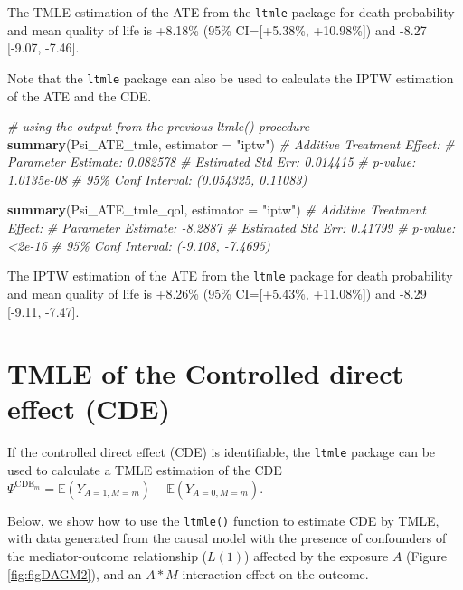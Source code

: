 \documentclass[
]{book}
\newenvironment{Shaded}{\begin{snugshade}}{\end{snugshade}}
\newcommand{\AttributeTok}[1]{\textcolor[rgb]{0.13,0.29,0.53}{#1}}
\newcommand{\CommentTok}[1]{\textcolor[rgb]{0.56,0.35,0.01}{\textit{#1}}}
\newcommand{\FunctionTok}[1]{\textcolor[rgb]{0.13,0.29,0.53}{\textbf{#1}}}
\newcommand{\NormalTok}[1]{#1}
\newcommand{\StringTok}[1]{\textcolor[rgb]{0.31,0.60,0.02}{#1}}
\begin{document}
The TMLE estimation of the ATE from the \texttt{ltmle} package for death probability and mean quality of life is +8.18\% (95\% CI={[}+5.38\%, +10.98\%{]}) and -8.27 {[}-9.07, -7.46{]}.

Note that the \texttt{ltmle} package can also be used to calculate the IPTW estimation of the ATE and the CDE.

\begin{Shaded}
\begin{Highlighting}[]
\CommentTok{\# using the output from the previous ltmle() procedure}
\FunctionTok{summary}\NormalTok{(Psi\_ATE\_tmle, }\AttributeTok{estimator =} \StringTok{"iptw"}\NormalTok{)}
\CommentTok{\# Additive Treatment Effect:}
\CommentTok{\#    Parameter Estimate:  0.082578 }
\CommentTok{\#     Estimated Std Err:  0.014415 }
\CommentTok{\#               p{-}value:  1.0135e{-}08 }
\CommentTok{\#     95\% Conf Interval: (0.054325, 0.11083) }

\FunctionTok{summary}\NormalTok{(Psi\_ATE\_tmle\_qol, }\AttributeTok{estimator =} \StringTok{"iptw"}\NormalTok{)}
\CommentTok{\# Additive Treatment Effect:}
\CommentTok{\#    Parameter Estimate:  {-}8.2887 }
\CommentTok{\#     Estimated Std Err:  0.41799 }
\CommentTok{\#               p{-}value:  \textless{}2e{-}16 }
\CommentTok{\#     95\% Conf Interval: ({-}9.108, {-}7.4695) }
\end{Highlighting}
\end{Shaded}

The IPTW estimation of the ATE from the \texttt{ltmle} package for death probability and mean quality of life is +8.26\% (95\% CI={[}+5.43\%, +11.08\%{]}) and -8.29 {[}-9.11, -7.47{]}.

\section{TMLE of the Controlled direct effect (CDE)}\label{tmle-of-the-controlled-direct-effect-cde}

If the controlled direct effect (CDE) is identifiable, the \texttt{ltmle} package can be used to calculate a TMLE estimation of the CDE \(\Psi^{\text{CDE}_m} = \mathbb{E}(Y_{A=1,M=m}) - \mathbb{E}(Y_{A=0,M=m})\).

Below, we show how to use the \texttt{ltmle()} function to estimate CDE by TMLE, with data generated from the causal model with the presence of confounders of the mediator-outcome relationship (\(L(1)\)) affected by the exposure \(A\) (Figure \ref{fig:figDAGM2}), and an \(A \ast M\) interaction effect on the outcome.
\end{document}
